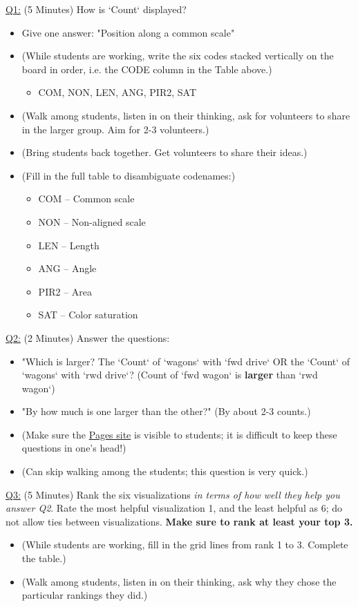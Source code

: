 \documentclass[11pt]{article}
\begin{document}
\uline{Q1:} (5 Minutes) How is `Count` displayed?
\begin{itemize}
\item Give one answer: "Position along a common scale"
\item (While students are working, write the six codes stacked vertically on the
board in order, i.e. the CODE column in the Table above.)
\begin{itemize}
\item COM, NON, LEN, ANG, PIR2, SAT
\end{itemize}
\item (Walk among students, listen in on their thinking, ask for volunteers to share
in the larger group. Aim for 2-3 volunteers.)
\item (Bring students back together. Get volunteers to share their ideas.)
\item (Fill in the full table to disambiguate codenames:)
\begin{itemize}
\item COM -- Common scale
\item NON -- Non-aligned scale
\item LEN -- Length
\item ANG -- Angle
\item PIR2 -- Area
\item SAT -- Color saturation
\end{itemize}
\end{itemize}

\uline{Q2:} (2 Minutes) Answer the questions:
\begin{itemize}
\item "Which is larger? The `Count` of `wagons` with `fwd drive` OR the `Count` of
`wagons` with `rwd drive`?
(Count of `fwd wagon` is \textbf{larger} than `rwd wagon`)
\item "By how much is one larger than the other?" (By about 2-3 counts.)
\item (Make sure the \href{https://citrineinformatics.github.io/ga-tech-workshop/05-vis-principles/index.html}{Pages site} is visible to students; it is difficult to keep
these questions in one's head!)
\item (Can skip walking among the students; this question is very quick.)
\end{itemize}

\uline{Q3:} (5 Minutes) Rank the six visualizations \emph{in terms of how well they help you answer
Q2}. Rate the most helpful visualization 1, and the least helpful as 6; do not
allow ties between visualizations. \textbf{Make sure to rank at least your top 3.}
\begin{itemize}
\item (While students are working, fill in the grid lines from rank 1 to 3. Complete
the table.)
\item (Walk among students, listen in on their thinking, ask why they chose the
particular rankings they did.)
\end{itemize}
\end{document}
